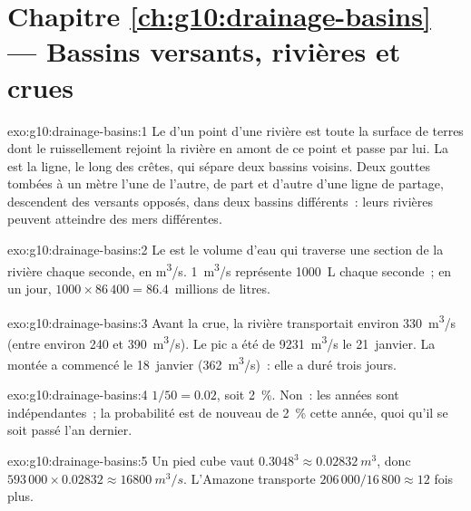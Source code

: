 \section*{Chapitre \ref{ch:g10:drainage-basins} --- Bassins versants, rivières et crues}

\begin{solution}{exo:g10:drainage-basins:1}
Le  d'un point d'une rivière est toute la surface de terres
dont le ruissellement rejoint la rivière en amont de ce point et passe par
lui. La  est la ligne, le long des crêtes, qui
sépare deux bassins voisins. Deux gouttes tombées à un mètre l'une de
l'autre, de part et d'autre d'une ligne de partage, descendent des versants
opposés, dans deux bassins différents~: leurs rivières peuvent atteindre
des mers différentes.
\end{solution}

\begin{solution}{exo:g10:drainage-basins:2}
Le  est le volume d'eau qui traverse une section de la rivière chaque
seconde, en \unit{m^3/s}. \qty{1}{m^3/s} représente \qty{1000}{L} chaque
seconde~; en un jour, $1000 \times 86\,400 = 86.4$~millions de litres.
\end{solution}

\begin{solution}{exo:g10:drainage-basins:3}
Avant la crue, la rivière transportait environ \qty{330}{m^3/s} (entre
environ \num{240} et \qty{390}{m^3/s}). Le pic a été de \qty{9231}{m^3/s}
le 21~janvier. La montée a commencé le 18~janvier (\qty{362}{m^3/s})~: elle
a duré trois jours.
\end{solution}

\begin{solution}{exo:g10:drainage-basins:4}
$1/50 = 0.02$, soit \qty{2}{\percent}. Non~: les années sont indépendantes~;
la probabilité est de nouveau de \qty{2}{\percent} cette année, quoi qu'il
se soit passé l'an dernier.
\end{solution}

\begin{solution}{exo:g10:drainage-basins:5}
Un pied cube vaut $0.3048^3 \approx \qty{0.02832}{m^3}$, donc
$593\,000 \times 0.02832 \approx \qty{16800}{m^3/s}$. L'Amazone transporte
$206\,000/16\,800 \approx 12$ fois plus.
\end{solution}

